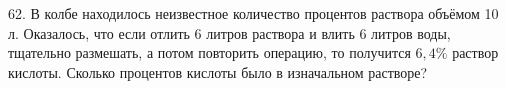 62. В колбе находилось неизвестное количество процентов раствора объёмом 10 л. Оказалось, что
если отлить 6 литров раствора и влить 6 литров воды, тщательно размешать, а потом повторить
операцию, то получится $6,4\%$ раствор кислоты. Сколько процентов кислоты было в изначальном
растворе?
\newpage

